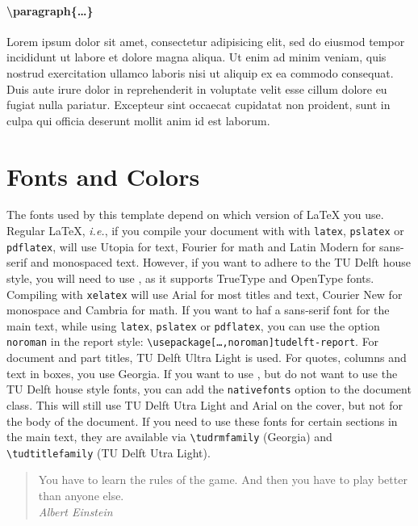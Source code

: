 \paragraph{\textbackslash paragraph\{\ldots\}}
Lorem ipsum dolor sit amet, consectetur adipisicing elit, sed do eiusmod tempor incididunt ut labore et dolore magna aliqua. Ut enim ad minim veniam, quis nostrud exercitation ullamco laboris nisi ut aliquip ex ea commodo consequat. Duis aute irure dolor in reprehenderit in voluptate velit esse cillum dolore eu fugiat nulla pariatur. Excepteur sint occaecat cupidatat non proident, sunt in culpa qui officia deserunt mollit anim id est laborum.

\section{Fonts and Colors}

The fonts used by this template depend on which version of \LaTeX{} you use. Regular \LaTeX, \emph{i.e.}, if you compile your document with with \texttt{latex}, \texttt{pslatex} or \texttt{pdflatex}, will use Utopia for text, Fourier for math and Latin Modern for sans-serif and monospaced text. 
However, if you want to adhere to the TU Delft house style, you will need to use \XeLaTeX, as it supports TrueType and OpenType fonts. Compiling with \texttt{xelatex} will use Arial for most titles and text, Courier New for monospace and Cambria for math. If you want to haf a sans-serif font for the
main text, while using \texttt{latex}, \texttt{pslatex} or \texttt{pdflatex}, you can use the option \texttt{noroman} in the report style: \texttt{\textbackslash usepackage[\ldots,noroman]{tudelft-report}}. For document and part titles,  TU Delft Ultra Light is used. For quotes, columns and text in boxes, you use Georgia. If you want to use \XeLaTeX, but do not want to use the TU Delft house style fonts, you can add the \texttt{nativefonts} option to the document class. This will still use  TU Delft Utra Light and Arial on the cover, but not for the body of the document. If you need to use these fonts for certain sections in the main text, they are available via \texttt{\textbackslash tudrmfamily} (Georgia) and \texttt{\textbackslash tudtitlefamily} (TU Delft Utra Light).

\begin{quote}
  You have to learn the rules of the game. And then you have to play better than anyone else.\\
  \emph{Albert Einstein}
\end{quote}

